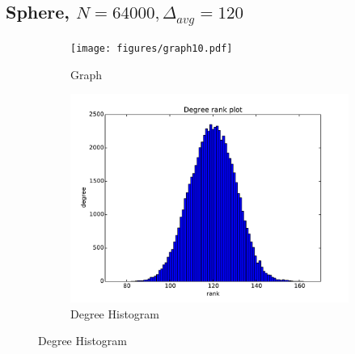 \documentclass[oneside, titlepage]{scrartcl}
\begin{document}
\subsection{Sphere, $N=64000, \Delta_{avg}=120$}
\begin{figure}[!h]
\centering
\begin{subfigure}{0.5\textwidth}
	\centering
	\texttt{[image: figures/graph10.pdf]}
	\caption{Graph}
\end{subfigure}%
\begin{subfigure}{0.5\textwidth}
	\centering
	\includegraphics[width=0.9\linewidth]{figures/degrees10.pdf}
	\caption{Degree Histogram}
\end{subfigure}


\end{figure}
\end{document}
